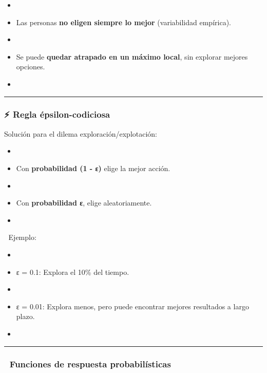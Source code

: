 \documentclass[
  letterpaper,
  DIV=11,
  numbers=noendperiod]{scrartcl}
\begin{document}
\begin{itemize}
\item
\item
  Las personas \textbf{no eligen siempre lo mejor} (variabilidad
  empírica).
\item
\item
  Se puede \textbf{quedar atrapado en un máximo local}, sin explorar
  mejores opciones.
\item
\end{itemize}

\begin{center}\rule{0.5\linewidth}{0.5pt}\end{center}

\hypertarget{regla-uxe9psilon-codiciosa}{%
\subsubsection{\texorpdfstring{⚡ \textbf{Regla
épsilon-codiciosa}}{⚡ Regla épsilon-codiciosa}}\label{regla-uxe9psilon-codiciosa}}

Solución para el dilema exploración/explotación:

\begin{itemize}
\item
\item
  Con \textbf{probabilidad (1 - ε)} elige la mejor acción.
\item
\item
  Con \textbf{probabilidad ε}, elige aleatoriamente.
\item
\end{itemize}

🔢 Ejemplo:

\begin{itemize}
\item
\item
  ε = 0.1: Explora el 10\% del tiempo.
\item
\item
  ε = 0.01: Explora menos, pero puede encontrar mejores resultados a
  largo plazo.
\item
\end{itemize}

\begin{center}\rule{0.5\linewidth}{0.5pt}\end{center}

\hypertarget{funciones-de-respuesta-probabiluxedsticas}{%
\subsubsection{\texorpdfstring{🧪 \textbf{Funciones de respuesta
probabilísticas}}{🧪 Funciones de respuesta probabilísticas}}\label{funciones-de-respuesta-probabiluxedsticas}}
\end{document}
